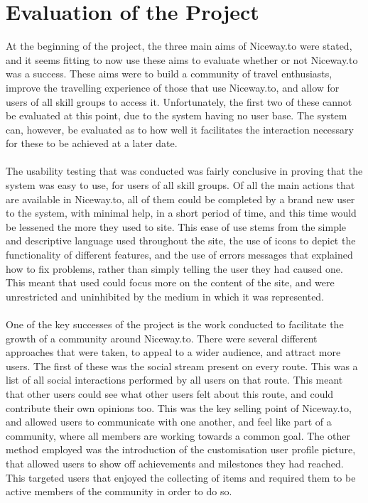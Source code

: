 \section{Evaluation of the Project}
\label{sec:eval}
At the beginning of the project, the three main aims of Niceway.to were stated, and it seems fitting to now use these aims to evaluate whether or not Niceway.to was a success. These aims were to build a community of travel enthusiasts, improve the travelling experience of those that use Niceway.to, and allow for users of all skill groups to access it. Unfortunately, the first two of these cannot be evaluated at this point, due to the system having no user base. The system can, however, be evaluated as to how well it facilitates the interaction necessary for these to be achieved at a later date.\ \\
\ \\
The usability testing that was conducted was fairly conclusive in proving that the system was easy to use, for users of all skill groups. Of all the main actions that are available in Niceway.to, all of them could be completed by a brand new user to the system, with minimal help, in a short period of time, and this time would be lessened the more they used to site. This ease of use stems from the simple and descriptive language used throughout the site, the use of icons to depict the functionality of different features, and the use of errors messages that explained how to fix problems, rather than simply telling the user they had caused one. This meant that used could focus more on the content of the site, and were unrestricted and uninhibited by the medium in which it was represented.
\ \\
\ \\
One of the key successes of the project is the work conducted to facilitate the growth of a community around Niceway.to. There were several different approaches that were taken, to appeal to a wider audience, and attract more users. The first of these was the social stream present on every route. This was a list of all social interactions performed by all users on that route. This meant that other users could see what other users felt about this route, and could contribute their own opinions too. This was the key selling point of Niceway.to, and allowed users to communicate with one another, and feel like part of a community, where all members are working towards a common goal. The other method employed was the introduction of the customisation user profile picture, that allowed users to show off achievements and milestones they had reached. This targeted users that enjoyed the collecting of items and required them to be active members of the community in order to do so.\ \\
